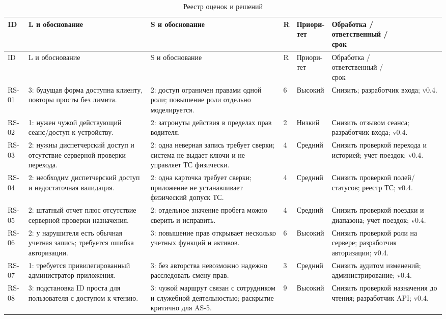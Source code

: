 \documentclass[12pt,a4paper]{article}
\begin{document}
\small
\begin{longtable}{@{}p{0.9cm}p{3.5cm}p{3.5cm}p{0.9cm}p{1.2cm}p{3.8cm}@{}}
\caption{Реестр оценок и решений}\\
\toprule ID & L и обоснование & S и обоснование & R & \shortstack{Приори-\\тет} & \shortstack[l]{Обработка /\\ответственный /\\срок}\\\midrule\endfirsthead
\toprule ID & L и обоснование & S и обоснование & R & \shortstack{Приори-\\тет} & \shortstack[l]{Обработка /\\ответственный /\\срок}\\\midrule\endhead
RS-01 & 3: будущая форма доступна клиенту, повторы просты без лимита. & 2: доступ ограничен правами одной роли; повышение роли отдельно моделируется. & 6 & Высокий & Снизить; разработчик входа; v0.4.\\
RS-02 & 1: нужен чужой действующий сеанс/доступ к устройству. & 2: затронуты действия в пределах прав водителя. & 2 & Низкий & Снизить отзывом сеанса; разработчик входа; v0.4.\\
RS-03 & 2: нужны диспетчерский доступ и отсутствие серверной проверки перехода. & 2: одна неверная запись требует сверки; система не выдает ключи и не управляет ТС физически. & 4 & Средний & Снизить проверкой перехода и историей; учет поездок; v0.4.\\
RS-04 & 2: необходим диспетчерский доступ и недостаточная валидация. & 2: одна карточка требует сверки; приложение не устанавливает физический допуск ТС. & 4 & Средний & Снизить проверкой полей/статусов; реестр ТС; v0.4.\\
RS-05 & 2: штатный отчет плюс отсутствие серверной проверки назначения. & 2: отдельное значение пробега можно сверить и исправить. & 4 & Средний & Снизить проверкой поездки и диапазона; учет поездок; v0.4.\\
RS-06 & 2: у нарушителя есть обычная учетная запись; требуется ошибка авторизации. & 3: повышение прав открывает несколько учетных функций и активов. & 6 & Высокий & Снизить проверкой роли на сервере; разработчик авторизации; v0.4.\\
RS-07 & 1: требуется привилегированный администратор приложения. & 3: без авторства невозможно надежно расследовать смену прав. & 3 & Средний & Снизить аудитом изменений; администрирование; v0.4.\\
RS-08 & 3: подстановка ID проста для пользователя с доступом к чтению. & 3: чужой маршрут связан с сотрудником и служебной деятельностью; раскрытие критично для AS-5. & 9 & Высокий & Снизить проверкой назначения до чтения; разработчик API; v0.4.\\

\end{longtable}
\end{document}
